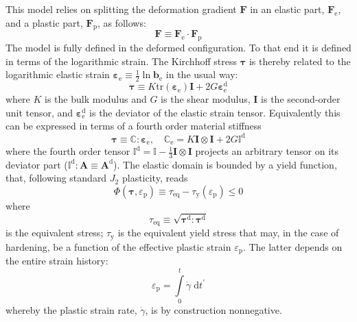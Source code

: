\documentclass{goose-article}
\newcommand\T[1]{\bm{{#1}}}
\newcommand\TT[1]{\mathbb{{#1}}}
\begin{document}
This model relies on splitting the deformation gradient $\T{F}$ in an elastic part,
$\T{F}_\mathrm{e}$, and a plastic part, $\T{F}_\mathrm{p}$, as follows:
\begin{equation}
    \T{F} \equiv \T{F}_\mathrm{e} \cdot \T{F}_\mathrm{p}
\end{equation}
The model is fully defined in the deformed configuration. To that end it is defined in terms of
the logarithmic strain. The Kirchhoff stress $\T{\tau}$ is thereby related to the
logarithmic elastic strain $\T{\varepsilon}_\mathrm{e} \equiv \tfrac{1}{2} \ln \T{b}_\mathrm{e}$
in the usual way:
\begin{equation}
    \T{\tau} \equiv K \mathrm{tr} \left( \T{\varepsilon}_\mathrm{e} \right) \T{I}
    + 2 G \T{\varepsilon}_\mathrm{e}^\mathrm{d}
\end{equation}
where $K$ is the bulk modulus and $G$ is the shear modulus,
$\T{I}$ is the second-order unit tensor,
and $\T{\varepsilon}_\mathrm{e}^\mathrm{d}$ is the deviator of the elastic strain tensor.
Equivalently this can be expressed in terms of a fourth order material stiffness
\begin{equation}
    \T{\tau} \equiv \TT{C} : \T{\varepsilon}_\mathrm{e},
    \quad
    \TT{C}_\mathrm{e} = K \T{I} \otimes \T{I} + 2 G \TT{I}^\mathrm{d}
    \label{eq:tangent:elas}
\end{equation}
where the fourth order tensor $\TT{I}^\mathrm{d} = \TT{I} - \tfrac{1}{3} \T{I} \otimes \T{I}$
projects an arbitrary tensor on its deviator part
($\TT{I}^\mathrm{d} : \T{A} \equiv \T{A}^\mathrm{d}$).
The elastic domain is bounded by a yield function, that,
following standard $J_2$ plasticity, reads
\begin{equation}
    \Phi(\T{\tau}, \varepsilon_\mathrm{p}) \equiv \tau_\mathrm{eq}
    - \tau_\mathrm{y}(\varepsilon_\mathrm{p}) \leq 0
\end{equation}
where
\begin{equation}
    \tau_\mathrm{eq} \equiv \sqrt{ \T{\tau}^\mathrm{d} : \T{\tau}^\mathrm{d} }
\end{equation}
is the equivalent stress; $\tau_\mathrm{y}$ is the equivalent yield stress that may,
in the case of hardening, be a function of the effective plastic strain $\varepsilon_\mathrm{p}$.
The latter depends on the entire strain history:
\begin{equation}
    \varepsilon_\mathrm{p} = \int\limits_0^t \dot{\gamma} \;\mathrm{d}t^\prime
    \label{eq:history}
\end{equation}
whereby the plastic strain rate, $\dot{\gamma}$, is by construction nonnegative.
\end{document}

